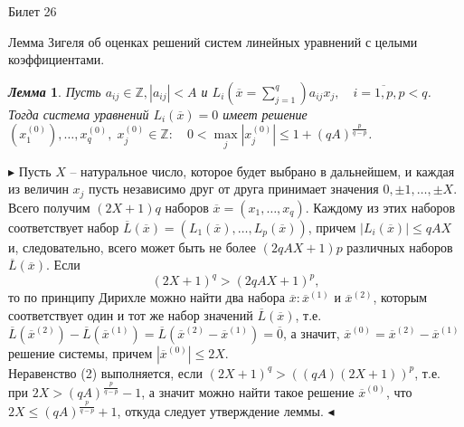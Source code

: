 \documentclass[a4paper,12pt]{article}
\newtheorem{lem}{\textit{Лемма}}
\newcommand{\q}{\quad}
\newcommand{\pb}{\blacktriangleright}
\newcommand{\pe}{\blacktriangleleft}
\newcommand{\bb}[1]{\mathbb{#1}}
\newcommand{\SL}{\sum\limits}
\begin{document}
\newpage
\begin{mybox2}{\hypertarget{bil26}{Билет 26}}

\begin{formbox}{}
Лемма Зигеля об оценках решений систем линейных уравнений с целыми коэффициентами.
\end{formbox}


\begin{formbox}{}
\begin{lem} Пусть \(a_{ij}\in\bb{Z}, |a_{ij}| < A\) и \(L_i(\overline{x} = \SL_{j=1}^q)a_{ij}x_j,\q i=\overline{1,p}, p < q\).\\
Тогда система уравнений \(L_i(\overline{x}) = 0\) имеет решение \((x_1^{(0)}),\dots,x_q^{(0)},\; x_j^{(0)} \in\bb{Z}:\q 0 < \max\limits_{j} |x_j^{(0)}|\le 1 + (qA)^{\frac{p}{q-p}} \).
\end{lem}
\end{formbox}
$\pb$ Пусть $X$ -- натуральное число, которое будет выбрано в дальнейшем,
и каждая из величин $x_j$ пусть независимо друг от друга принимает значения \(0, \pm1, \dots , \pm X.\)\\
Всего получим $(2X + 1)q$ наборов $\overline{x} = (x_1, \dots , x_q)$. Каждому из этих наборов соответствует набор $\overline{L}(\overline{x}) = (L_1(\overline{x}), \dots , L_p(\overline{x}))$, причем $|L_i(\overline{x})|\le qAX$ и, следовательно, всего может быть не более \((2qAX + 1)p\) различных наборов $\overline{L}(\overline{x})$. Если 
\begin{equation}
(2X+1)^q > (2qAX+1)^p,
\end{equation}
 то по принципу Дирихле можно найти два набора $\overline{x}: \overline{x}^{(1)}$ и $\overline{x}^{(2)}$, которым соответствует один и тот же набор значений $\overline{L}(\overline{x})$, т.е. $\overline{L}(\overline{x}^{(2)}) - \overline{L}(\overline{x}^{(1)}) = \overline{L}(\overline{x}^{(2)} - \overline{x}^{(1)}) = \overline{0}  $, а значит, $\overline{x}^{(0)} = \overline{x}^{(2)} - \overline{x}^{(1)} $ решение системы, причем $|\overline{x}^{(0)}| \le 2X.$\\
Неравенство (2) выполняется, если $(2X+1)^q > ((qA)(2X+1))^p$, т.е. при $2X>(qA)^{\frac{p}{q-p}}-1$, а значит можно найти такое решение $\overline{x}^{(0)}$, что $2X\le (qA)^{\frac{p}{q-p}}+1$, откуда следует утверждение леммы. $\pe$

\end{mybox2}
\end{document}
